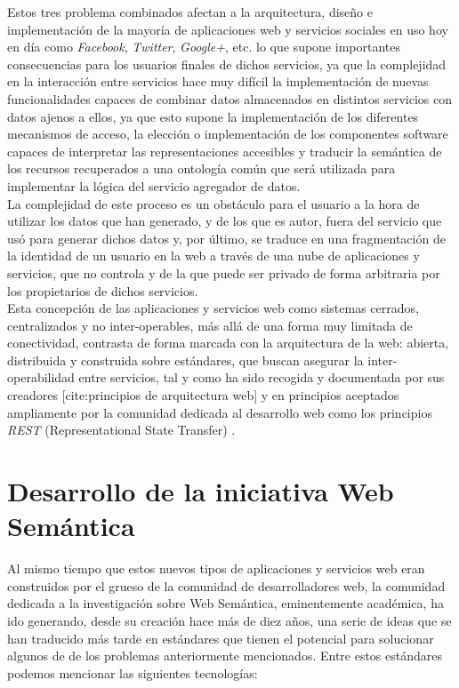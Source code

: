 Estos tres problema combinados afectan a la arquitectura, dise\~no e implementaci\'on de la mayor\'ia de aplicaciones web y servicios sociales en uso hoy en d\'ia como {\it Facebook}, {\it Twitter}, {\it Google+}, etc. lo que supone importantes consecuencias para los usuarios finales de dichos servicios, ya que la complejidad en la interacci\'on entre servicios hace muy dif\'icil la implementaci\'on de nuevas funcionalidades capaces de combinar datos almacenados en distintos servicios con datos ajenos a ellos, ya que esto supone la implementaci\'on de los diferentes mecanismos de acceso, la elecci\'on o implementaci\'on de los componentes software capaces de interpretar las representaciones accesibles y traducir la sem\'antica de los recursos recuperados a una ontolog\'ia com\'un que ser\'a utilizada para implementar la l\'ogica del servicio agregador de datos.\\
La complejidad de este proceso es un obst\'aculo para el usuario a la hora de utilizar los datos que han generado, y de los que es autor, fuera del servicio que us\'o para generar dichos datos y, por \'ultimo, se traduce en una fragmentaci\'on de la identidad de un usuario en la web a trav\'es de una nube de aplicaciones y servicios, que no controla y de la que puede ser privado de forma arbitraria por los propietarios de dichos servicios.\\

Esta concepci\'on de las aplicaciones y servicios web como sistemas cerrados, centralizados y no inter-operables, m\'as all\'a de una forma muy limitada de conectividad, contrasta de forma marcada con la arquitectura de la web: abierta, distribuida y construida sobre est\'andares, que buscan asegurar la inter-operabilidad entre servicios, tal y como ha sido recogida y documentada por sus creadores [cite:principios de arquitectura web] y en principios aceptados ampliamente por la comunidad dedicada al desarrollo web como los principios {\it REST} (Representational State Transfer) \cite{fielding2000representational}.\\

\section{Desarrollo de la iniciativa Web Sem\'antica}
Al mismo tiempo que estos nuevos tipos de aplicaciones y servicios web eran construidos por el grueso de la comunidad de desarrolladores web, la comunidad dedicada a la investigaci\'on sobre Web Sem\'antica, eminentemente acad\'emica, ha ido generando, desde su creaci\'on hace m\'as de diez a\~nos, una serie de ideas que se han traducido m\'as tarde en est\'andares que tienen el potencial para solucionar algunos de de los problemas anteriormente mencionados. Entre estos est\'andares podemos mencionar las siguientes tecnolog\'ias:

